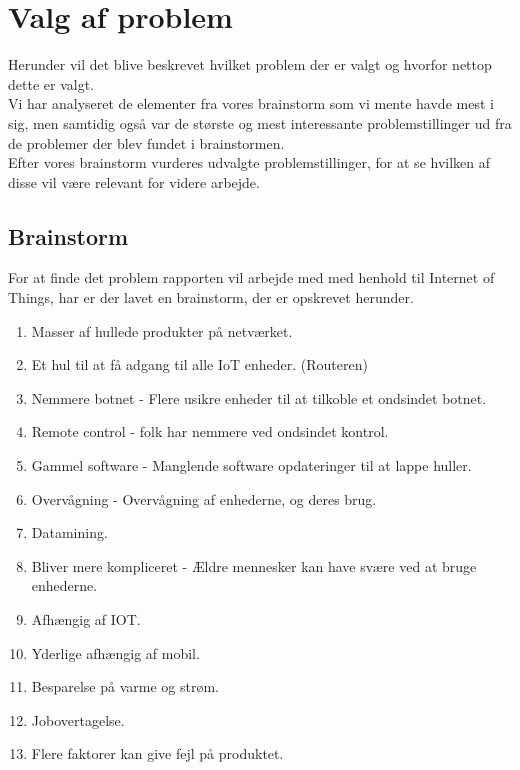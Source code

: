 \section{Valg af problem}
Herunder vil det blive beskrevet hvilket problem der er valgt og hvorfor nettop dette er valgt.\\
Vi har analyseret de elementer fra vores brainstorm som vi mente havde mest i sig, men samtidig også var de største og mest interessante problemstillinger ud fra de problemer der blev fundet i brainstormen.\\
Efter vores brainstorm vurderes udvalgte problemstillinger, for at se hvilken af disse vil være relevant for videre arbejde.



    \subsection{Brainstorm}
    For at finde det problem rapporten vil arbejde med med henhold til Internet of Things, har er der lavet en brainstorm, der er opskrevet herunder.
        
        \begin{enumerate}
            \item Masser af hullede produkter på netværket.
            \item Et hul til at få adgang til alle IoT enheder. (Routeren)
            \item Nemmere botnet - Flere usikre enheder til at tilkoble et ondsindet botnet.
            \item Remote control - folk har nemmere ved ondsindet kontrol.
            \item Gammel software - Manglende software opdateringer til at lappe huller.
            \item Overvågning - Overvågning af enhederne, og deres brug.
            \item Datamining.
            \item Bliver mere kompliceret - Ældre mennesker kan have svære ved at bruge enhederne.
            \item Afhængig af IOT.
            \item Yderlige afhængig af mobil.
            \item Besparelse på varme og strøm.
            \item Jobovertagelse. 
            \item Flere faktorer kan give fejl på produktet.
        \end{enumerate}
\newpage


